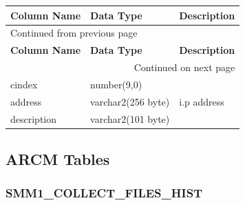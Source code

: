 \documentclass[12pt,twoside]{article}
\begin{document}
\begin{longtable}{l|l|l}
\hline
\textbf{Column Name} & \textbf{Data Type} & \textbf{Description}\\
\hline
\endfirsthead
\multicolumn{3}{l}{Continued from previous page} \\
\hline

\textbf{Column Name} & \textbf{Data Type} & \textbf{Description} \\

\hline
\endhead
\hline\multicolumn{3}{r}{Continued on next page} \\
\endfoot
\endlastfoot
\hline
cindex & number(9,0) & \\
address & varchar2(256 byte) & i.p address\\
description & varchar2(101 byte) & \\
\hline
\end{longtable}
\normalsize
\newpage
\subsection{ARCM Tables}
\label{sec:orgheadline136}
\subsubsection{SMM1\_COLLECT\_FILES\_HIST}
\label{sec:orgheadline133}
\footnotesize
\end{document}
